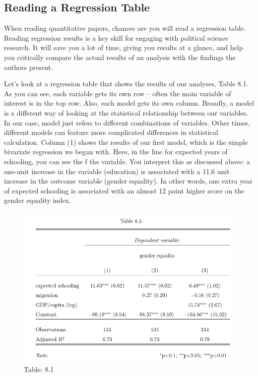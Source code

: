 \documentclass{book}
\begin{document}
\hypertarget{reading-a-regression-table}{%
\subsection{Reading a Regression Table}\label{reading-a-regression-table}}

When reading quantitative papers, chances are you will read a regression
table. Reading regression results is a key skill for engaging with political
science research. It will save you a lot of time, giving you results at a
glance, and help you critically compare the actual results of an analysis with
the findings the authors present.

Let's look at a regression table that shows the results of our analyses, Table
8.1. As you can see, each variable gets its own row -- often the main variable
of interest is in the top row. Also, each model gets its own column. Broadly,
a model is a different way of looking at the statistical relationship between
our variables. In our case, model just refers to different combinations of
variables. Other times, different models can feature more complicated
differences in statistical calculation. Column (1) shows the results of our
first model, which is the simple bivariate regression we began with. Here, in
the line for expected years of schooling, you can see the f the variable. You
interpret this as discussed above: a one-unit increase in the variable
(education) is associated with a 11.6 unit increase in the outcome variable
(gender equality). In other words, one extra year of expected schooling is
associated with an almost 12 point higher score on the gender equality index.

\begin{figure}
\centering
\includegraphics{images/largen/large-n-results-table.png}
\caption{Table: 8.1}
\end{figure}
\end{document}
